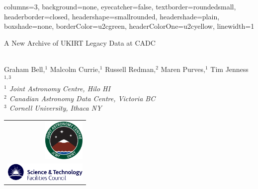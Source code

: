 \documentclass[a0paper,portrait]{baposter}
\begin{document}
\begin{poster}{
    columns=3,
    background=none,
    eyecatcher=false,
    textborder=roundedsmall,
    headerborder=closed,
    headershape=smallrounded,
    headershade=plain,
    boxshade=none,
    borderColor=u2cgreen,
    headerColorOne=u2cyellow,
    linewidth=1
}{

}{\raggedright \smaller
A New Archive of UKIRT Legacy Data at CADC
}{
\vspace{0.1cm} \\
Graham Bell,$^1$ Malcolm Currie,$^1$ Russell Redman,$^2$ Maren Purves,$^1$ Tim Jenness$^{1,3}$
\vspace{0.1cm} \\
\smaller[2]
\textsl{$^1$ Joint Astronomy Centre, Hilo HI} \\
\textsl{$^2$ Canadian Astronomy Data Centre, Victoria BC} \\
\textsl{$^3$ Cornell University, Ithaca NY}
}{
\begin{tabular}{r}
\includegraphics[width=2cm]{jaclogo} \\
\includegraphics[width=4cm]{stfclogo}
\end{tabular}
}

\end{poster}
\end{document}
